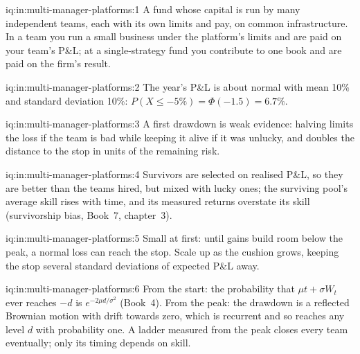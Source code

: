 \begin{solution}{iq:in:multi-manager-platforms:1}
A fund whose capital is run by many independent teams, each with its own limits and pay, on common infrastructure.
In a team you run a small business under the platform's limits and are paid on your team's P\&L; at a single-strategy
fund you contribute to one book and are paid on the firm's result.
\end{solution}

\begin{solution}{iq:in:multi-manager-platforms:2}
The year's P\&L is about normal with mean 10\% and standard deviation 10\%: $P(X\le-5\%)=\Phi(-1.5)=6.7\%$.
\end{solution}

\begin{solution}{iq:in:multi-manager-platforms:3}
A first drawdown is weak evidence: halving limits the loss if the team is bad while keeping it alive if it was
unlucky, and doubles the distance to the stop in units of the remaining risk.
\end{solution}

\begin{solution}{iq:in:multi-manager-platforms:4}
Survivors are selected on realised P\&L, so they are better than the teams hired, but mixed with lucky ones; the
surviving pool's average skill rises with time, and its measured returns overstate its skill (survivorship bias,
Book~7, chapter~3).
\end{solution}

\begin{solution}{iq:in:multi-manager-platforms:5}
Small at first: until gains build room below the peak, a normal loss can reach the stop. Scale up as the cushion
grows, keeping the stop several standard deviations of expected P\&L away.
\end{solution}

\begin{solution}{iq:in:multi-manager-platforms:6}
From the start: the probability that $\mu t+\sigma W_t$ ever reaches $-d$ is $e^{-2\mu d/\sigma^2}$ (Book~4). From the peak:
the drawdown is a reflected Brownian motion with drift towards zero, which is recurrent and so reaches any level $d$ with
probability one. A ladder measured from the peak closes every team eventually; only its timing depends on skill.
\end{solution}
